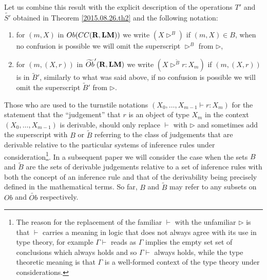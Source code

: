 \documentclass[11pt]{article}
\newcommand{\rr}{{\bf R}}
\newcommand{\lm}{{\bf LM}}
\newcommand{\wt}{\widetilde}
\begin{document}
Let us combine this result with the explicit description of the operations $T'$ and $\wt{S'}$ obtained in Theorem \ref{2015.08.26.th2} and the following notation:
%
\begin{enumerate}
\item for $(m,X)$ in $Ob(CC(\rr,\lm))$ we write $(X\rhd^{B})$ if $(m,X)\in B$, when no confusion is possible we will omit the superscript $\rhd^B$ from $\rhd$,
\item for $(m,(X,r))$ in $\wt{Ob}'(\rr,\lm)$ we write $(X\rhd^{\wt{B}} r:X_m)$ if $(m,(X,r))$ is in $\wt{B}'$, similarly to what was said above, if no confusion is possible we will omit the superscript $\wt{B}'$ from $\rhd$. 
\end{enumerate}
%
Those who are used to the turnstile notations $(X_0,\dots,X_{m-1}\vdash r:X_m)$ for the statement that the ``judgement'' that $r$ is an object of type $X_m$ in the context $(X_0,\dots,X_{m-1})$  is derivable, should only replace $\vdash$ with $\rhd$ and sometimes add the superscript with $B$ or $\wt{B}$ referring to the class of judgements that are derivable relative to the particular systems of inference rules under consideration\footnote{The reason for the replacement of the familiar $\vdash$ with the unfamiliar $\rhd$ is that $\vdash$ carries a meaning in logic that does not always agree with its use in type theory, for example $\Gamma\vdash$ reads as $\Gamma$ implies the empty set set of conclusions which always holds and so $\Gamma\vdash$ always holds, while the type theoretic meaning is that $\Gamma$ is a well-formed context of the type theory under considerations.}. In a subsequent paper we will consider the case when the sets $B$ and $\wt{B}$ are the sets of derivable judgements relative to a set of inference rules with both the concept of an inference rule and that of the derivability being precisely defined in the mathematical terms. So far, $B$ and $\wt{B}$ may refer to any subsets on $Ob$ and $\wt{Ob}$ respectively. 
\end{document}
